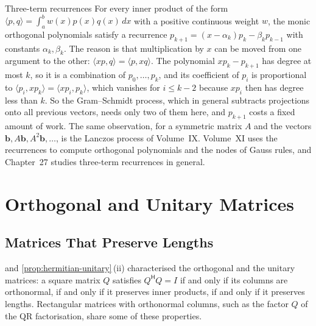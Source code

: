 \begin{note}{Three-term recurrences}
For every inner product of the form $\langle p,q\rangle=\int_a^bw(x)p(x)q(x)\,dx$ with a positive continuous weight $w$, the monic orthogonal polynomials satisfy a recurrence $p_{k+1}=(x-\alpha_k)p_k-\beta_kp_{k-1}$ with constants $\alpha_k,\beta_k$. The reason is that multiplication by $x$ can be moved from one argument to the other: $\langle xp,q\rangle=\langle p,xq\rangle$. The polynomial $xp_k-p_{k+1}$ has degree at most $k$, so it is a combination of $p_0,\ldots,p_k$, and its coefficient of $p_i$ is proportional to $\langle p_i,xp_k\rangle=\langle xp_i,p_k\rangle$, which vanishes for $i\le k-2$ because $xp_i$ then has degree less than $k$. So the Gram--Schmidt process, which in general subtracts projections onto all previous vectors, needs only two of them here, and $p_{k+1}$ costs a fixed amount of work. The same observation, for a symmetric matrix $A$ and the vectors $\mathbf b,A\mathbf b,A^2\mathbf b,\ldots$, is the Lanczos process of Volume~IX. Volume~XI uses the recurrences to compute orthogonal polynomials and the nodes of Gauss rules, and Chapter~27 studies three-term recurrences in general.
\end{note}

\section{Orthogonal and Unitary Matrices}
\label{sec:unitary-matrices}

\subsection{Matrices That Preserve Lengths}

 and \cref{prop:hermitian-unitary}\,(ii) characterised the orthogonal and the unitary matrices: a square matrix $Q$ satisfies $Q^{\mathsf H}Q=I$ if and only if its columns are orthonormal, if and only if it preserves inner products, if and only if it preserves lengths. Rectangular matrices with orthonormal columns, such as the factor $Q$ of the QR factorisation, share some of these properties.


